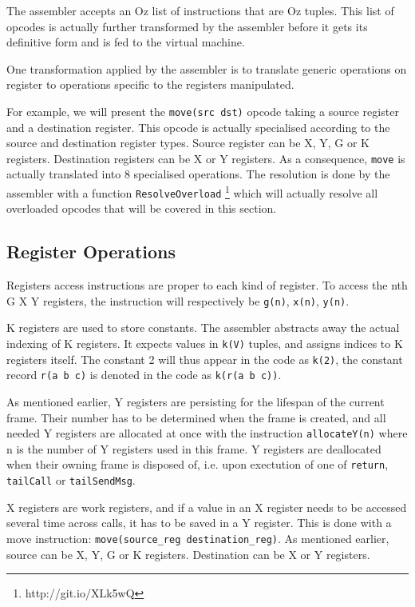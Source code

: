 \documentclass[a4paper]{memoir}
\begin{document}
The assembler accepts an Oz list of instructions that are Oz tuples. This list
of opcodes is actually further transformed by
the assembler before it gets its definitive form and is fed to the virtual
machine.                                             

One transformation applied by the assembler is to translate generic operations
on register to operations specific to the registers manipulated. 

For example, we will present the \lstinline!move(src dst)! opcode taking a
source register and a destination register. This opcode is actually
specialised according to the source and destination register types. Source
register can be X, Y, G or K registers. Destination registers can be 
X or Y registers. As a consequence, \lstinline!move! is actually translated into
8 specialised operations. The resolution is done by the
assembler with a function
\lstinline!ResolveOverload! \cite{Moz2src}\footnote{http://git.io/XLk5wQ} 
which will actually resolve all overloaded opcodes that will be covered in this section. 

\subsection{Register Operations}\label{sec:intro:opcode:registers}
Registers access instructions are proper to each kind of register. To access the nth G X Y
registers, the instruction will respectively be \lstinline!g(n)!,
\lstinline!x(n)!, \lstinline!y(n)!. 

K registers are used to store constants. The assembler abstracts away the actual indexing of K registers. It expects values in \lstinline!k(V)! tuples, and assigns indices to K registers itself. The constant 2 will thus appear in the code as
\lstinline!k(2)!, the constant record \lstinline!r(a b c)! is denoted in the
code as \lstinline!k(r(a b c))!.


As mentioned earlier, Y registers are persisting for the lifespan of the current frame. Their number has to be determined when the frame is created, and all needed Y registers are allocated at once with the instruction \lstinline!allocateY(n)! where n is the number of Y registers used in this frame.
Y registers are deallocated when their owning frame is disposed of, i.e. upon exectution of one of \lstinline!return!, \lstinline!tailCall! or \lstinline!tailSendMsg!.

X registers are work registers, and if a value in an X register needs to be accessed several time across calls, it has to be saved in a Y register. This is done with a move instruction: \lstinline!move(source_reg destination_reg)!.
As mentioned earlier, source
can be  X, Y, G or K registers. Destination can be X or Y registers.
\end{document}
